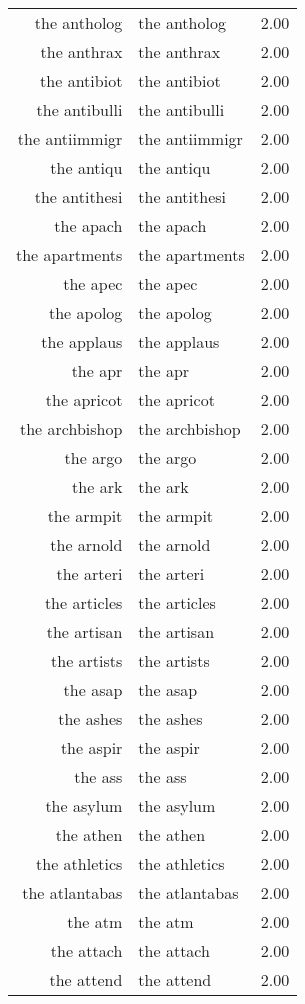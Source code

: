 \begin{table}[ht]
\begin{tabular}{rlr}
  the antholog & the antholog & 2.00 \\ 
  the anthrax & the anthrax & 2.00 \\ 
  the antibiot & the antibiot & 2.00 \\ 
  the antibulli & the antibulli & 2.00 \\ 
  the antiimmigr & the antiimmigr & 2.00 \\ 
  the antiqu & the antiqu & 2.00 \\ 
  the antithesi & the antithesi & 2.00 \\ 
  the apach & the apach & 2.00 \\ 
  the apartments & the apartments & 2.00 \\ 
  the apec & the apec & 2.00 \\ 
  the apolog & the apolog & 2.00 \\ 
  the applaus & the applaus & 2.00 \\ 
  the apr & the apr & 2.00 \\ 
  the apricot & the apricot & 2.00 \\ 
  the archbishop & the archbishop & 2.00 \\ 
  the argo & the argo & 2.00 \\ 
  the ark & the ark & 2.00 \\ 
  the armpit & the armpit & 2.00 \\ 
  the arnold & the arnold & 2.00 \\ 
  the arteri & the arteri & 2.00 \\ 
  the articles & the articles & 2.00 \\ 
  the artisan & the artisan & 2.00 \\ 
  the artists & the artists & 2.00 \\ 
  the asap & the asap & 2.00 \\ 
  the ashes & the ashes & 2.00 \\ 
  the aspir & the aspir & 2.00 \\ 
  the ass & the ass & 2.00 \\ 
  the asylum & the asylum & 2.00 \\ 
  the athen & the athen & 2.00 \\ 
  the athletics & the athletics & 2.00 \\ 
  the atlantabas & the atlantabas & 2.00 \\ 
  the atm & the atm & 2.00 \\ 
  the attach & the attach & 2.00 \\ 
  the attend & the attend & 2.00 \\ 

\end{tabular}
\end{table}
